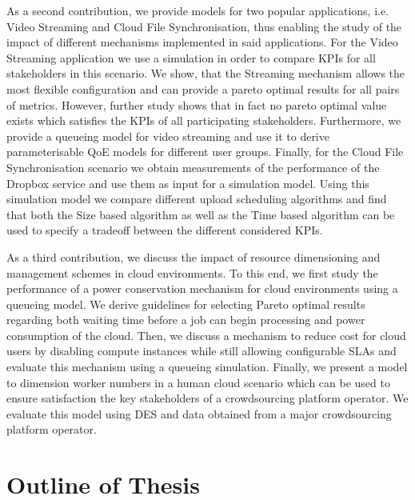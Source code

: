 As a second contribution, we provide models for two popular applications, i.e. Video Streaming and Cloud File Synchronisation, thus enabling the study of the impact of different mechanisms implemented in said applications.
For the Video Streaming application we use a simulation in order to compare \glspl{KPI} for all stakeholders in this scenario.
We show, that the Streaming mechanism allows the most flexible configuration and can provide a pareto optimal results for all pairs of metrics.
However, further study shows that in fact no pareto optimal value exists which satisfies the \glspl{KPI} of all participating stakeholders.
Furthermore, we provide a queueing model for video streaming and use it to derive parameterisable \gls{QoE} models for different user groups.
Finally, for the Cloud File Synchronisation scenario we obtain measurements of the performance of the Dropbox service and use them as input for a simulation model.
Using this simulation model we compare different upload scheduling algorithms and find that both the Size based algorithm as well as the Time based algorithm can be used to specify a tradeoff between the different considered \glspl{KPI}.

As a third contribution, we discuss the impact of resource dimensioning and management schemes in cloud environments.
To this end, we first study the performance of a power conservation mechanism for cloud environments using a queueing model.
We derive guidelines for selecting Pareto optimal results regarding both waiting time before a job can begin processing and power consumption of the cloud.
Then, we discuss a mechanism to reduce cost for cloud users by disabling compute instances while still allowing configurable \glspl{SLA} and evaluate this mechanism using a queueing simulation.
Finally, we present a model to dimension worker numbers in a human cloud scenario which can be used to ensure satisfaction the key stakeholders of a crowdsourcing platform operator.
We evaluate this model using \gls{DES} and data obtained from a major crowdsourcing platform operator. 

\section{Outline of Thesis}\label{sec:introduction:outline}

